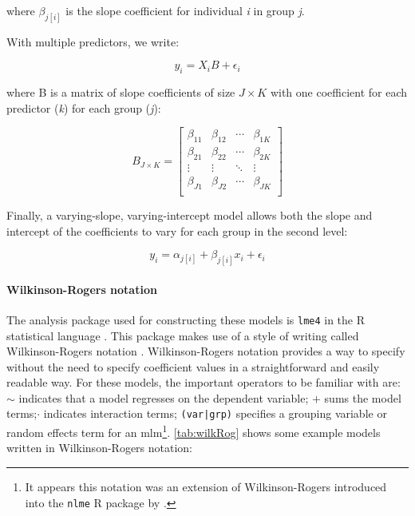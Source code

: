 where $\beta_{j[i]}$ is the slope coefficient for individual \emph{i} in group \emph{j}. 

With multiple predictors, we write:

\begin{equation}
  y_i = X_i B + \epsilon_i
\end{equation}

where B is a matrix of slope coefficients of size $J\times K$ with one coefficient for each predictor (\emph{k}) for each group (\emph{j}):

\[
  B_{J\times K} =
  \left[ {\begin{array}{cccc}
    \beta_{11} & \beta_{12} & \cdots & \beta_{1K}\\
    \beta_{21} & \beta_{22} & \cdots & \beta_{2K}\\
    \vdots & \vdots & \ddots & \vdots\\
    \beta_{J1} & \beta_{J2} & \cdots & \beta_{JK}\\
  \end{array} } \right]
\]

Finally, a varying-slope, varying-intercept model allows both the slope and intercept of the coefficients to vary for each group in the second level:

\begin{equation}
  y_i = \alpha_{j[i]} + \beta_{j[i]}x_i + \epsilon_i
\end{equation}

\paragraph*{Wilkinson-Rogers notation}
The analysis package used for constructing these models is \texttt{lme4} \citep{Bates2015Fitting} in the R statistical language \citep{RCT2018R}. This package makes use of a style of writing  called Wilkinson-Rogers notation \citep{Wilkinson1973Symbolic}. Wilkinson-Rogers notation provides a way to specify  without the need to specify coefficient values in a straightforward and easily readable way. For these models, the important operators to be familiar with are: $\sim$ indicates that a model regresses on the dependent variable; $+$ sums the model terms;$\cdot$ indicates interaction terms; \texttt{(var|grp)} specifies a grouping variable or random effects term for an \gls{mlm}\footnote{It appears this notation was an extension of Wilkinson-Rogers introduced into the \texttt{nlme} R package by \citet{Pinheiro1997Graphical}.}. \cref{tab:wilkRog} shows some example models written in Wilkinson-Rogers notation:


